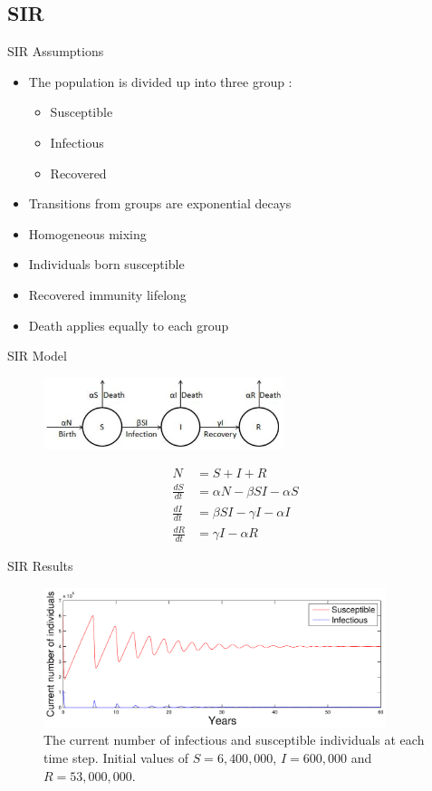 \documentclass{beamer}
\begin{document}
\subsection{SIR}
\begin{frame} {SIR} {Assumptions}
\begin{itemize}
	\item{The population is divided up into three group :
	\begin{itemize}
	 \item{Susceptible}
	 \item{Infectious}
	 \item{Recovered}
	\end{itemize}}
	\item{Transitions from groups are exponential decays}
	\item{Homogeneous mixing}	
	\item{Individuals born susceptible}
	\item{Recovered immunity lifelong}
	\item{Death applies equally to each group}	
\end{itemize}
\end{frame}

\begin{frame} {SIR} {Model}
\begin{figure}
\centering
\includegraphics[width=70mm]{simpleSIRModel.jpg}
\label{fig:simpleSIRpictoral}
\end{figure}
\begin{align*} 
N &= S + I + R \\
\frac{dS}{dt} &= \alpha N - \beta SI - \alpha S \\ 
\frac{dI}{dt} &= \beta SI - \gamma I - \alpha I \\ 
\frac{dR}{dt} &= \gamma I - \alpha R
\end{align*}
\end{frame}

\begin{frame} {SIR} {Results}
\begin{figure}
\centering
\includegraphics[width=100mm]{figsimpleSIR60}
\caption{The current number of infectious and susceptible individuals at each time step. Initial values of $S=6,400,000$, $I=600,000$ and $R=53,000,000$.}
\end{figure}
\end{frame}
\end{document}
